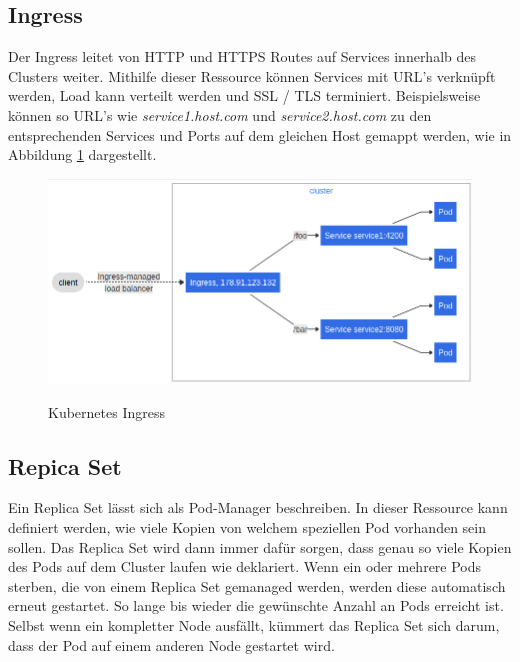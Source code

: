 \subsection{Ingress}
Der Ingress leitet von \ac{HTTP} und \ac{HTTPS} Routes auf Services innerhalb des Clusters weiter.
Mithilfe dieser Ressource können Services mit \ac{URL}'s verknüpft werden, Load kann verteilt werden und \ac{SSL} / \ac{TLS} terminiert.
Beispielsweise können so \ac{URL}'s wie \textit{service1.host.com} und \textit{service2.host.com} zu den entsprechenden Services und Ports auf dem gleichen Host gemappt werden, wie in Abbildung \ref{fig:ingress} dargestellt.
\cite{kubernetes_ingress}
\begin{figure}[ht]
        \caption{Kubernetes Ingress\cite{kubernetes_ingress}}
        \centering
        \includegraphics[width=\textwidth]{bilder/kubernetes_ingress.png}
        \label{fig:ingress}
\end{figure}

\subsection{Repica Set}
Ein Replica Set lässt sich als Pod-Manager beschreiben. 
In dieser Ressource kann definiert werden, wie viele Kopien von welchem speziellen Pod vorhanden sein sollen.
Das Replica Set wird dann immer dafür sorgen, dass genau so viele Kopien des Pods auf dem Cluster laufen wie deklariert. 
Wenn ein oder mehrere Pods sterben, die von einem Replica Set gemanaged werden, werden diese automatisch erneut gestartet. 
So lange bis wieder die gewünschte Anzahl an Pods erreicht ist.
Selbst wenn ein kompletter Node ausfällt, kümmert das Replica Set sich darum, dass der Pod auf einem anderen Node gestartet wird.
\cite[S.103 ff.]{Kubernetes_up_and_running}

